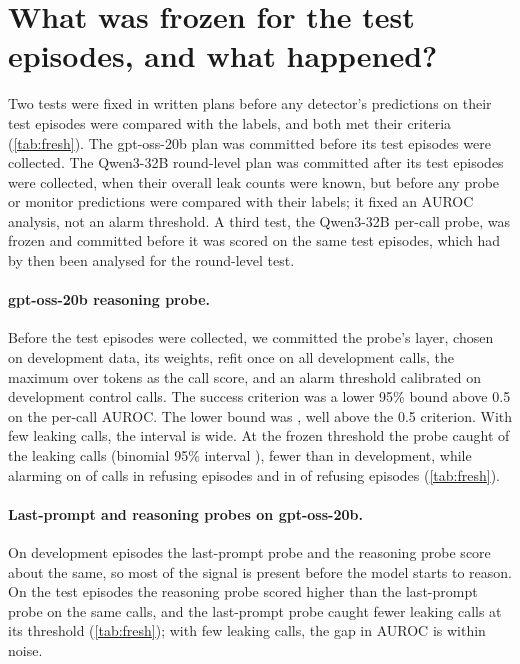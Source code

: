 \section{What was frozen for the test episodes, and what happened?}
\label{app:confirmation}

Two tests were fixed in written plans before any detector's predictions on their test episodes were compared with the labels, and both met their criteria (\cref{tab:fresh}).
The gpt-oss-20b plan was committed before its test episodes were collected.
The Qwen3-32B round-level plan was committed after its test episodes were collected, when their overall leak counts were known, but before any probe or monitor predictions were compared with their labels; it fixed an AUROC analysis, not an alarm threshold.
A third test, the Qwen3-32B per-call probe, was frozen and committed before it was scored on the same test episodes, which had by then been analysed for the round-level test.

\paragraph{gpt-oss-20b reasoning probe.}
Before the test episodes were collected, we committed the probe's layer, chosen on development data, its weights, refit once on all development calls, the maximum over tokens as the call score, and an alarm threshold calibrated on development control calls.
The success criterion was a lower 95\% bound above 0.5 on the per-call AUROC.
The lower bound was \gptossFreshReasoningLow{}, well above the 0.5 criterion.
With few leaking calls, the interval is wide.
At the frozen threshold the probe caught \gptossFreshCaught{} of the leaking calls (binomial 95\% interval \gptossFreshCaughtCI{}), fewer than in development, while alarming on \gptossFreshRefusingAlarm{} of calls in refusing episodes and in \gptossFreshRefusingEpisodeAlarm{} of refusing episodes (\cref{tab:fresh}).

\paragraph{Last-prompt and reasoning probes on gpt-oss-20b.}
On development episodes the last-prompt probe and the reasoning probe score about the same, so most of the signal is present before the model starts to reason.
On the test episodes the reasoning probe scored higher than the last-prompt probe on the same calls, and the last-prompt probe caught fewer leaking calls at its threshold (\cref{tab:fresh}); with few leaking calls, the gap in AUROC is within noise.

